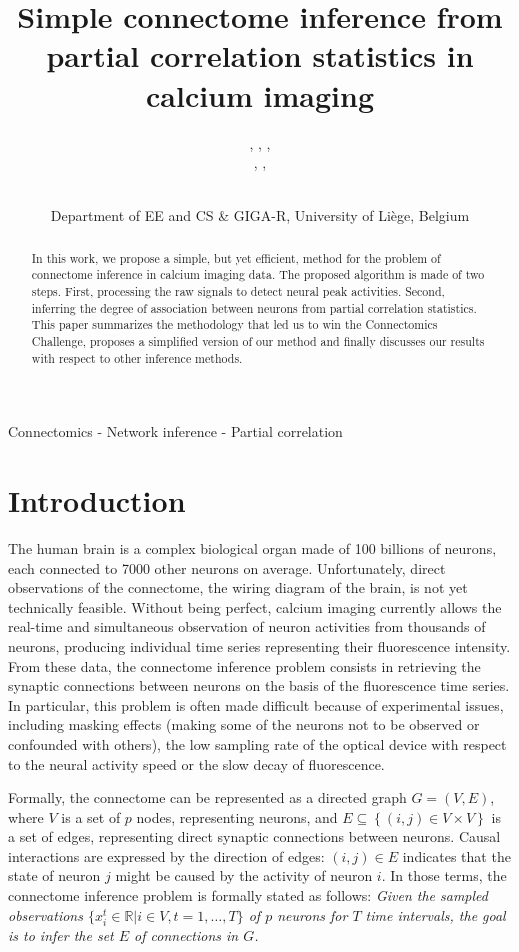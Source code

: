 \documentclass[wcp]{jmlr}
\title{Simple connectome inference from partial correlation statistics in calcium imaging}
\author{\Name{Antonio Sutera} ,
   \Name{Arnaud Joly},
   \Name{Vincent François-Lavet}, \Email{a.sutera@ulg.ac.be}\\
   \Name{Aaron Qiu},
   \Name{Gilles Louppe},
   \Name{Damien Ernst}\and\Name{Pierre Geurts}
    \\
   \addr Department of EE and CS \& GIGA-R, University of Li\`ege, Belgium}
\begin{document}
\maketitle

\begin{abstract}
In this work, we propose a simple, but yet efficient, method for the problem of
connectome inference in calcium imaging data. The proposed algorithm is made of
two steps. First, processing the raw signals to detect neural peak activities.
Second, inferring the degree of association between neurons from partial
correlation statistics. This paper summarizes the methodology that led us to
win the Connectomics Challenge, proposes a simplified version of our method and
finally discusses our results with respect to other inference methods.
\end{abstract}

\begin{keywords}
Connectomics - Network inference - Partial correlation
\end{keywords}


\section{Introduction}\label{sec:intro}

The human brain is a complex biological
organ made of 100 billions of neurons, each connected to 7000 other neurons on
average. Unfortunately, direct observations of the connectome, the wiring
diagram of the brain, is not yet technically feasible. Without being perfect,
calcium imaging currently allows the real-time and simultaneous observation of
neuron activities from thousands of neurons, producing individual time series
representing their fluorescence intensity. From these data, the connectome
inference problem consists in retrieving the synaptic connections between
neurons on the basis of the fluorescence time series. In particular, this
problem is often made difficult because of experimental issues, including
masking effects (making some of the neurons not to be observed or confounded
with others), the low sampling rate of the optical device with respect to the
neural activity speed or the slow decay of fluorescence.

Formally, the connectome can be represented as a directed graph $G=(V,E)$,
where $V$ is a set of $p$ nodes, representing neurons, and $E \subseteq
\left\{(i, j) \in V \times V\right\}$ is a set of edges, representing direct
synaptic connections between neurons. Causal interactions are expressed by the
direction of edges: $(i, j) \in E$ indicates that the state of neuron $j$ might
be caused by the activity of neuron $i$. In those terms,  the connectome
inference problem is formally stated as follows:  \textit{Given the sampled
observations $\{ x^t_i \in \mathbb{R} | i \in V, t = 1, \dots, T \}$ of $p$
neurons for $T$ time intervals, the goal is to infer the set $E$ of connections
in $G$.}
\end{document}
